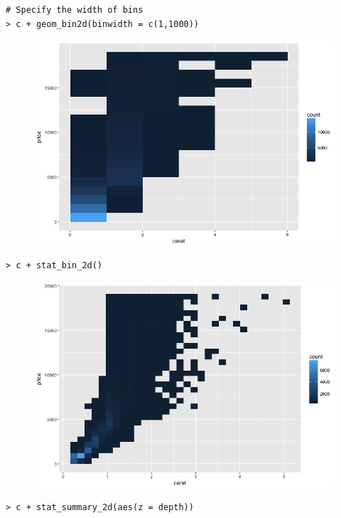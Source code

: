 \begin{lstlisting}[language=html]
# Specify the width of bins
> c + geom_bin2d(binwidth = c(1,1000))
\end{lstlisting}
\begin{figure}[H]\begin{center}\includegraphics[scale=1 ]{ilu/bg58.png}\end{center}\end{figure}
\begin{lstlisting}[language=html]
> c + stat_bin_2d()
\end{lstlisting}
\begin{figure}[H]\begin{center}\includegraphics[scale=1 ]{ilu/bg59.png}\end{center}\end{figure}
\begin{lstlisting}[language=html]
> c + stat_summary_2d(aes(z = depth))
\end{lstlisting}
